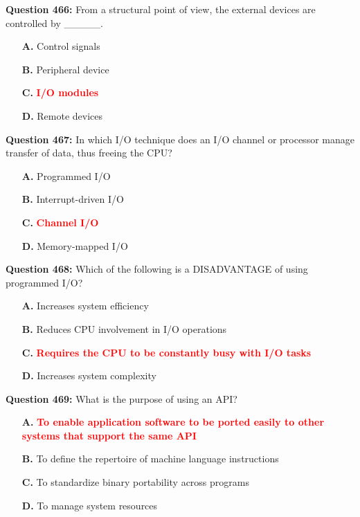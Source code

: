 \documentclass[12pt,a4paper]{article}
\begin{document}
\vspace{0.5cm}

\textbf{Question 466:} From a structural point of view, the external devices are controlled by _____.

\begin{itemize}
    \item[\textbf{A.}] Control signals
    \item[\textbf{B.}] Peripheral device
    \item[\textbf{C.}] \textcolor{red}{\textbf{I/O modules}}
    \item[\textbf{D.}] Remote devices
\end{itemize}

\vspace{0.5cm}

\textbf{Question 467:} In which I/O technique does an I/O channel or processor manage transfer of data, thus freeing the CPU?

\begin{itemize}
    \item[\textbf{A.}] Programmed I/O
    \item[\textbf{B.}] Interrupt-driven I/O
    \item[\textbf{C.}] \textcolor{red}{\textbf{Channel I/O}}
    \item[\textbf{D.}] Memory-mapped I/O
\end{itemize}

\vspace{0.5cm}

\textbf{Question 468:} Which of the following is a DISADVANTAGE of using programmed I/O?

\begin{itemize}
    \item[\textbf{A.}] Increases system efficiency
    \item[\textbf{B.}] Reduces CPU involvement in I/O operations
    \item[\textbf{C.}] \textcolor{red}{\textbf{Requires the CPU to be constantly busy with I/O tasks}}
    \item[\textbf{D.}] Increases system complexity
\end{itemize}

\vspace{0.5cm}

\textbf{Question 469:} What is the purpose of using an API?

\begin{itemize}
    \item[\textbf{A.}] \textcolor{red}{\textbf{To enable application software to be ported easily to other systems that support the same API}}
    \item[\textbf{B.}] To define the repertoire of machine language instructions
    \item[\textbf{C.}] To standardize binary portability across programs
    \item[\textbf{D.}] To manage system resources
\end{itemize}
\end{document}
